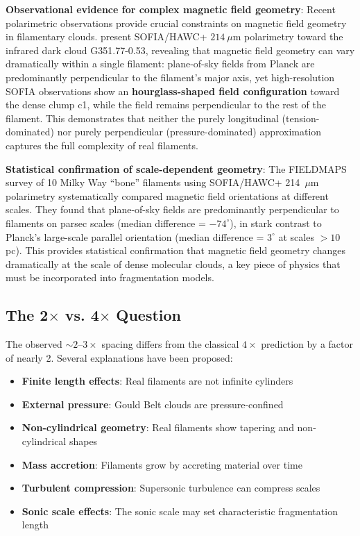 \documentclass[11pt,a4paper]{article}
\begin{document}
\textbf{Observational evidence for complex magnetic field geometry}: Recent polarimetric observations provide crucial constraints on magnetic field geometry in filamentary clouds. \citet{Jadhav2026} present SOFIA/HAWC+ $214~\mu$m polarimetry toward the infrared dark cloud G351.77-0.53, revealing that magnetic field geometry can vary dramatically within a single filament: plane-of-sky fields from Planck are predominantly perpendicular to the filament's major axis, yet high-resolution SOFIA observations show an \textbf{hourglass-shaped field configuration} toward the dense clump c1, while the field remains perpendicular to the rest of the filament. This demonstrates that neither the purely longitudinal (tension-dominated) nor purely perpendicular (pressure-dominated) approximation captures the full complexity of real filaments.

\textbf{Statistical confirmation of scale-dependent geometry}: The FIELDMAPS survey of 10 Milky Way ``bone'' filaments \citep{Coude2025} using SOFIA/HAWC+ 214~$\mu$m polarimetry systematically compared magnetic field orientations at different scales. They found that plane-of-sky fields are predominantly perpendicular to filaments on parsec scales (median difference = $-74^{\circ}$), in stark contrast to Planck's large-scale parallel orientation (median difference = $3^{\circ}$ at scales $>10$ pc). This provides statistical confirmation that magnetic field geometry changes dramatically at the scale of dense molecular clouds, a key piece of physics that must be incorporated into fragmentation models.

\subsection{The 2$\times$ vs. 4$\times$ Question}

The observed $\sim2$--$3\times$ spacing differs from the classical $4\times$ prediction by a factor of nearly 2. Several explanations have been proposed:
\begin{itemize}
    \item \textbf{Finite length effects}: Real filaments are not infinite cylinders \citep{Inutsuka1997}
    \item \textbf{External pressure}: Gould Belt clouds are pressure-confined \citep{Fischera2012}
    \item \textbf{Non-cylindrical geometry}: Real filaments show tapering and non-cylindrical shapes
    \item \textbf{Mass accretion}: Filaments grow by accreting material over time \citep{Heitsch2013, Chen2024}
    \item \textbf{Turbulent compression}: Supersonic turbulence can compress scales \citep{Padoan2011}
    \item \textbf{Sonic scale effects}: The sonic scale may set characteristic fragmentation length \citep{Federrath2016}
\end{itemize}
\end{document}
